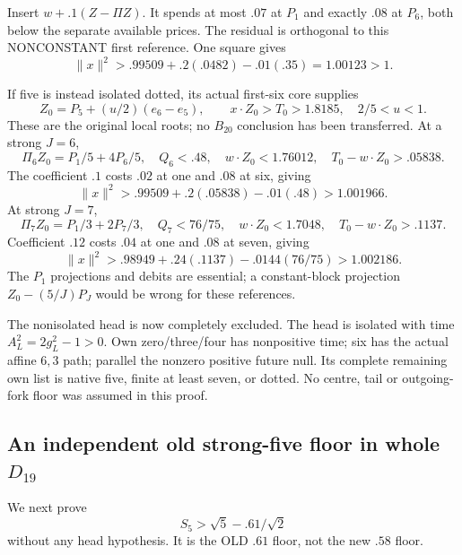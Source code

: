 \documentclass[11pt]{article}
\theoremstyle{definition}
\theoremstyle{remark}
\begin{document}
Insert \(w+.1(Z-\Pi Z)\).
It spends at most \(.07\) at
\(P_1\) and exactly \(.08\) at
\(P_6\), both below the separate
available prices.
The residual is orthogonal
to this NONCONSTANT first reference.
One square gives
\[
                         \|x\|^2>.99509+.2(.0482)-.01(.35)
                                           =1.00123>1 .
\]

If five is instead isolated dotted,
its actual first-six core supplies
\[
 Z_0=P_5+(u/2)(e_6-e_5),\qquad
                   x\cdot Z_0>T_0>1.8185,\quad2/5<u<1 .
\]
These are the original local
roots; no \(B_{20}\) conclusion
has been transferred.
At a strong \(J=6\),
\[
 \Pi_6Z_0=P_1/5+4P_6/5,\quad
 Q_6<.48,\quad w\cdot Z_0<1.76012,\quad
                            T_0-w\cdot Z_0>.05838 .
\]
The coefficient \(.1\) costs
\(.02\) at one and \(.08\) at
six, giving
\[
                         \|x\|^2>.99509+.2(.05838)-.01(.48)>1.001966 .
\]
At strong \(J=7\),
\[
 \Pi_7Z_0=P_1/3+2P_7/3,\quad Q_7<76/75,\quad
             w\cdot Z_0<1.7048,\quad T_0-w\cdot Z_0>.1137 .
\]
Coefficient \(.12\) costs \(.04\)
at one and \(.08\) at seven,
giving
\[
                    \|x\|^2>.98949+.24(.1137)-.0144(76/75)>1.002186 .
\]
The \(P_1\) projections and debits
are essential; a constant-block
projection \(Z_0-(5/J)P_J\) would
be wrong for these references.

The nonisolated head is now
completely excluded.
The head is isolated with time
\(A_L^2=2g_L^2-1>0\).
Own zero/three/four has nonpositive
time; six has the actual affine
\(6,3\) path; parallel the
nonzero positive future null.
Its complete remaining own list
is native five, finite at least
seven, or dotted.
No centre, tail or outgoing-fork
floor was assumed in this proof.

\subsection{An independent old strong-five floor in whole \(D_{19}\)}
\label{app:exact19:Doldfive}

We next prove
\[
                              S_5>\sqrt5-.61/\sqrt2
\tag{D19old5}\label{app:exact19:eq:Doldfive}
\]
without any head hypothesis.
It is the OLD \(.61\) floor,
not the new \(.58\) floor.
\end{document}
